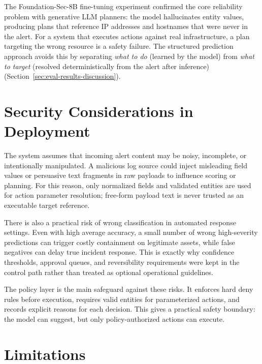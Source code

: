 The Foundation-Sec-8B fine-tuning experiment confirmed the core reliability problem with generative LLM planners: the model hallucinates entity values, producing plans that reference IP addresses and hostnames that were never in the alert. For a system that executes actions against real infrastructure, a plan targeting the wrong resource is a safety failure. The structured prediction approach avoids this by separating \textit{what to do} (learned by the model) from \textit{what to target} (resolved deterministically from the alert after inference) (Section~\ref{sec:eval-results-discussion}).

\section{Security Considerations in Deployment}
\label{sec:discussion-security}

The system assumes that incoming alert content may be noisy, incomplete, or intentionally
manipulated. A malicious log source could inject misleading field values or persuasive text
fragments in raw payloads to influence scoring or planning. For this reason, only
normalized fields and validated entities are used for action parameter resolution; free-form
payload text is never trusted as an executable target reference.

There is also a practical risk of wrong classification in automated response settings. Even
with high average accuracy, a small number of wrong high-severity predictions can trigger
costly containment on legitimate assets, while false negatives can delay true incident
response. This is exactly why confidence thresholds, approval queues, and reversibility
requirements were kept in the control path rather than treated as optional operational
guidelines.

The policy layer is the main safeguard against these risks. It enforces hard deny rules
before execution, requires valid entities for parameterized actions, and records explicit
reasons for each decision. This gives a practical safety boundary: the model can suggest,
but only policy-authorized actions can execute.

\section{Limitations}
\label{sec:discussion-limitations}

